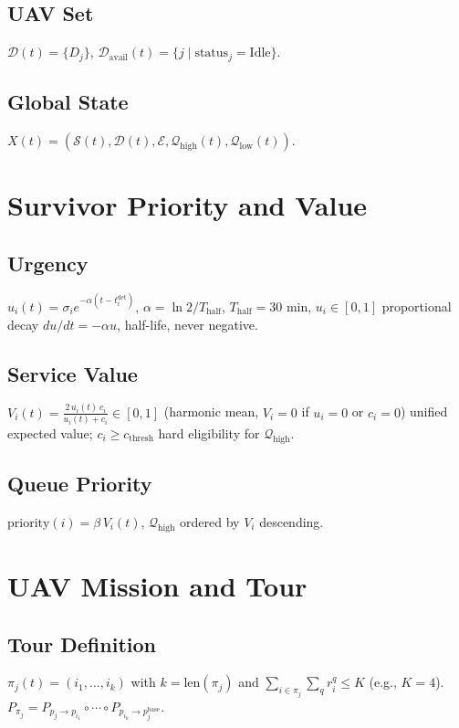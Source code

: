 \documentclass[conference]{IEEEtran}
\begin{document}
\subsection{UAV Set}
$\mathcal{D}(t)=\{D_j\}$, $\mathcal{D}_{\text{avail}}(t)=\{j\mid \text{status}_j=\text{Idle}\}$.

\subsection{Global State}
$X(t)=(\mathcal{S}(t),\mathcal{D}(t),\mathcal{E},\mathcal{Q}_{\text{high}}(t),\mathcal{Q}_{\text{low}}(t))$.

\section{Survivor Priority and Value}

\subsection{Urgency}
$u_i(t)=\sigma_i e^{-\alpha(t-t_i^{\text{det}})}$, $\alpha=\ln2/T_{\text{half}}$, $T_{\text{half}}=30$ min, $u_i\in[0,1]$ proportional decay $du/dt=-\alpha u$, half-life, never negative.

\subsection{Service Value}
$V_i(t)=\frac{2\,u_i(t)\,c_i}{u_i(t)+c_i}\in[0,1]$ (harmonic mean, $V_i=0$ if $u_i=0$ or $c_i=0$) unified expected value; $c_i\geq c_{\text{thresh}}$ hard eligibility for $\mathcal{Q}_{\text{high}}$.

\subsection{Queue Priority}
$\text{priority}(i)=\beta\,V_i(t)$, $\mathcal{Q}_{\text{high}}$ ordered by $V_i$ descending.

\section{UAV Mission and Tour}

\subsection{Tour Definition}
$\pi_j(t)=(i_1,\dots,i_k)$ with $k=\text{len}(\pi_j)$ and $\sum_{i\in\pi_j}\sum_q r_i^q \leq K$ (e.g., $K=4$). $P_{\pi_j}=P_{p_j\to p_{i_1}}\circ\cdots\circ P_{p_{i_k}\to p_j^{\text{base}}}$.
\end{document}
